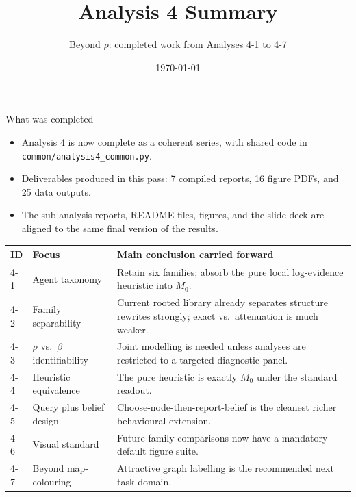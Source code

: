 \documentclass[aspectratio=169,10pt]{beamer}
\title{Analysis 4 Summary}
\subtitle{Beyond $\rho$: completed work from Analyses 4-1 to 4-7}
\author{}
\date{\today}
\begin{document}
\begin{frame}
\titlepage
\end{frame}

\begin{frame}{What was completed}
\small
\begin{itemize}
    \item Analysis 4 is now complete as a coherent series, with shared code in \texttt{common/analysis4\_common.py}.
    \item Deliverables produced in this pass: 7 compiled reports, 16 figure PDFs, and 25 data outputs.
    \item The sub-analysis reports, README files, figures, and the slide deck are aligned to the same final version of the results.
\end{itemize}

\medskip
\scriptsize
\begin{tabular}{p{0.75cm}p{4.15cm}p{6.25cm}}
\toprule
ID & Focus & Main conclusion carried forward \\
\midrule
4-1 & Agent taxonomy & Retain six families; absorb the pure local log-evidence heuristic into $M_0$. \\
4-2 & Family separability & Current rooted library already separates structure rewrites strongly; exact vs.\ attenuation is much weaker. \\
4-3 & $\rho$ vs.\ $\beta$ identifiability & Joint modelling is needed unless analyses are restricted to a targeted diagnostic panel. \\
4-4 & Heuristic equivalence & The pure heuristic is exactly $M_0$ under the standard readout. \\
4-5 & Query plus belief design & Choose-node-then-report-belief is the cleanest richer behavioural extension. \\
4-6 & Visual standard & Future family comparisons now have a mandatory default figure suite. \\
4-7 & Beyond map-colouring & Attractive graph labelling is the recommended next task domain. \\
\bottomrule
\end{tabular}
\end{frame}
\end{document}
